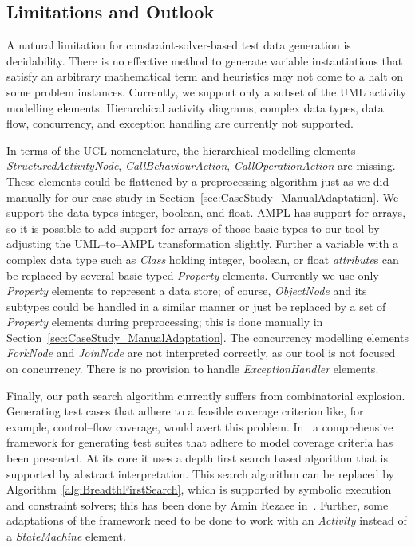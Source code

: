 \documentclass[runningheads,a4paper]{llncs}%
\newcommand{\UMLType}[1]{\textsf{\textit{#1}}} %
\newcommand{\UMLReference}[1]{\textsf{\textit{#1}}} %
\begin{document}
\subsection{Limitations and Outlook}
A natural limitation for constraint-solver-based test data generation is
decidability. There is no effective method to generate variable instantiations
that satisfy an arbitrary mathematical term and heuristics may not come to a
halt on some problem instances. Currently, we support only a subset of the UML
activity modelling elements. Hierarchical activity diagrams, complex data types,
data flow, concurrency, and exception handling are currently not supported.

In terms of the UCL nomenclature, the hierarchical modelling elements
\UMLType{StructuredActivityNode}, \UMLType{CallBehaviourAction},
\UMLType{CallOperationAction} are missing. These elements could be flattened by
a preprocessing algorithm just as we did manually for our case study in
Section~\ref{sec:CaseStudy_ManualAdaptation}. We support the data types integer,
boolean, and float. AMPL has support for arrays, so it is possible to add
support for arrays of those basic types to our tool by adjusting the
UML--to--AMPL transformation slightly. Further a variable with a complex data
type such as \UMLType{Class} holding integer, boolean, or float
\UMLReference{attribute}s can be replaced by several basic typed
\UMLType{Property} elements. Currently we use only \UMLType{Property} elements
to represent a data store; of course, \UMLType{ObjectNode} and its subtypes
could be handled in a similar manner or just be replaced by a set of
\UMLType{Property} elements during preprocessing; this is done manually in
Section~\ref{sec:CaseStudy_ManualAdaptation}. The concurrency modelling elements
\UMLType{ForkNode} and \UMLType{JoinNode} are not interpreted correctly, as our
tool is not focused on concurrency. There is no provision to handle
\UMLType{ExceptionHandler} elements.

Finally, our path search algorithm currently suffers from combinatorial
explosion. Generating test cases that adhere to a feasible coverage criterion
like, for example, control--flow coverage, would avert this problem.
In~\cite{ParTeG} a comprehensive framework for generating test suites that
adhere to model coverage criteria has been presented. At its core it uses a
depth first search based algorithm that is supported by abstract interpretation.
This search algorithm can be replaced by Algorithm~\ref{alg:BreadthFirstSearch},
which is supported by symbolic execution and constraint solvers; this has been
done by Amin Rezaee in~\cite{Rezaee2014ANew}. Further, some adaptations of the
framework need to be done to work with an \UMLType{Activity} instead of a
\UMLType{StateMachine} element.
%
\end{document}
